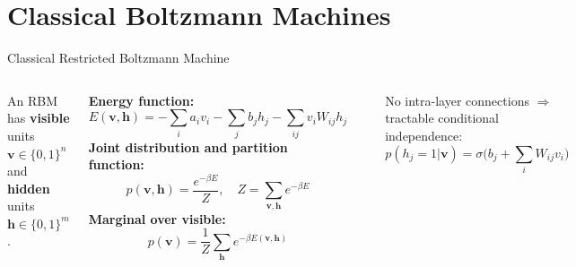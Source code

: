 \documentclass[aspectratio=169,10pt]{beamer}
\begin{document}
\section{Classical Boltzmann Machines}

\begin{frame}{Classical Restricted Boltzmann Machine}
  \begin{columns}[T]
      An RBM has \textbf{visible} units $\mathbf{v}\in\{0,1\}^n$
      and \textbf{hidden} units $\mathbf{h}\in\{0,1\}^m$.

      \textbf{Energy function:}
      \[
        E(\mathbf{v},\mathbf{h}) =
        -\sum_i a_i v_i
        -\sum_j b_j h_j
        -\sum_{ij} v_i W_{ij} h_j
      \]
      \textbf{Joint distribution and partition function:}
      \[
        p(\mathbf{v},\mathbf{h}) = \frac{e^{-\beta E}}{Z},\quad
        Z = \sum_{\mathbf{v},\mathbf{h}} e^{-\beta E}
      \]
      \textbf{Marginal over visible:}
      \[
        p(\mathbf{v}) = \frac{1}{Z}\sum_\mathbf{h} e^{-\beta E(\mathbf{v},\mathbf{h})}
      \]
      \vspace{0.1cm}
      \begin{center}
      \end{center}
      \vspace{0.1cm}
      No intra-layer connections $\Rightarrow$ tractable
      conditional independence:
      \[
        p(h_j=1|\mathbf{v}) = \sigma\!\bigl(b_j+\sum_i W_{ij}v_i\bigr)
      \]
  \end{columns}
\end{frame}
\end{document}
